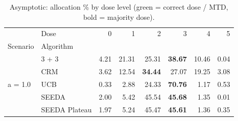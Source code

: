 \begin{table}[H]
\centering
\caption{Asymptotic: allocation \% by dose level (green = correct dose / MTD, bold = majority dose).}
\label{tab:asym_alloc_by_dose}
\begin{tabular}{llrrrrrr}
\toprule
 & Dose & 0 & 1 & 2 & 3 & 4 & 5 \\
Scenario & Algorithm &  &  &  &  &  &  \\
\midrule
\multirow[c]{5}{*}{a = 1.0} & 3 + 3 & 4.21 & 21.31 & {\cellcolor[HTML]{C8E6C9}} 25.31 & \bfseries 38.67 & 10.46 & 0.04 \\
 & CRM & 3.62 & 12.54 & {\cellcolor[HTML]{C8E6C9}} \bfseries 34.44 & 27.07 & 19.25 & 3.08 \\
 & UCB & 0.33 & 2.88 & {\cellcolor[HTML]{C8E6C9}} 24.33 & \bfseries 70.76 & 1.17 & 0.53 \\
 & SEEDA & 2.00 & 5.42 & {\cellcolor[HTML]{C8E6C9}} 45.54 & \bfseries 45.68 & 1.35 & 0.01 \\
 & SEEDA Plateau & 1.97 & 5.24 & {\cellcolor[HTML]{C8E6C9}} 45.47 & \bfseries 45.61 & 1.36 & 0.35 \\
\bottomrule
\end{tabular}
\end{table}

